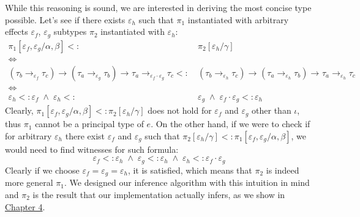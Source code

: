 \documentclass[declaration,shortabstract]{iithesis}
\theoremstyle{definition} \newtheorem{definition}{Definition}[section]
\newcommand{\arrow}[3]{{#1}\rightarrow_{#2}{#3}}
\begin{document}
While this reasoning is sound, we are interested in deriving the most concise type possible. Let's see if there exists $\varepsilon_h$ such that $\pi_1$ instantiated with arbitrary effects $\varepsilon_f$, $\varepsilon_g$ subtypes $\pi_2$ instantiated with $\varepsilon_h$:
\begin{align*}
    \pi_1[\varepsilon_f, \varepsilon_g / \alpha, \beta] <: & \: \pi_2 [\varepsilon_h / \gamma]
    \\ \iff \\ 
    \arrow{(\arrow{\tau_b}{\varepsilon_f}{\tau_c})}{}{
        \arrow{(\arrow{\tau_a}{\varepsilon_g}{\tau_b})}{}{
                \arrow{\tau_a}{\varepsilon_f \cdot \varepsilon_g}{\tau_c}}} <: & \:
    \arrow{(\arrow{\tau_b}{\varepsilon_h}{\tau_c})}{}{
        \arrow{(\arrow{\tau_a}{\varepsilon_h}{\tau_b})}{}{
                \arrow{\tau_a}{\varepsilon_h}{\tau_c}}}
    \\ \iff \\ 
    \varepsilon_h <: \varepsilon_f          \;\wedge\; 
    \varepsilon_h <: &  \: \varepsilon_g    \;\wedge\; 
    \varepsilon_f \cdot \varepsilon_g <: \varepsilon_h
\end{align*}
Clearly, $\pi_1[\varepsilon_f, \varepsilon_g / \alpha, \beta] <: \pi_2 [\varepsilon_h / \gamma]$
does not hold for $\varepsilon_f$ and $\varepsilon_g$ other than $\iota$, thus $\pi_1$ cannot be a principal type of $e$.
On the other hand, if we were to check if for arbitrary $\varepsilon_h$ there exist $\varepsilon_f$ and $\varepsilon_g$ such that
$\pi_2 [\varepsilon_h / \gamma] <: \pi_1[\varepsilon_f, \varepsilon_g / \alpha, \beta]$, we would need to find witnesses for such formula:
$$ \varepsilon_f <: \varepsilon_h          \;\wedge\; 
    \varepsilon_g <: \varepsilon_h    \;\wedge\; 
     \varepsilon_h <: \varepsilon_f \cdot \varepsilon_g $$
Clearly if we choose $ \varepsilon_f = \varepsilon_g = \varepsilon_h$, it is satisfied, which means that $\pi_2$ is indeed more general $\pi_1$.
We designed our inference algorithm with this intuition in mind and $\pi_2$ is the result that our implementation actually infers, as we show in \hyperlink{section.4.4}{Chapter 4}.

\end{document}
